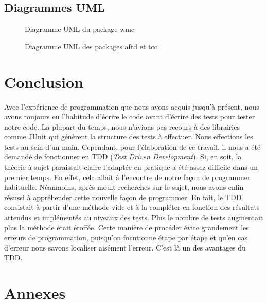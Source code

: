 \documentclass[11pt]{report}
\begin{document}
		
	\section{Diagrammes UML}\label{uml}
		
		\begin{figure}[h]
			\centering
			\caption{Diagramme UML du package wmc}
			\label{uml1}
		\end{figure}
		
		\begin{figure}[h]
			\centering
			\caption{Diagramme UML des packages aftd et tcc}
			\label{uml2}
		\end{figure}
		

\chapter{Conclusion}
	Avec l'expérience de programmation que nous avons acquis jusqu'à présent, nous avons toujours eu l'habitude d'écrire le code avant d'écrire des tests pour tester notre code. La plupart du temps, nous n'avions pas recours à des librairies comme JUnit qui génèrent la structure des tests à effectuer. Nous effections les tests au sein d'un main. Cependant, pour l'élaboration de ce travail, il nous a été demandé de fonctionner en TDD (\textit{Test Driven Development}). Si, en soit, la théorie à sujet paraissait claire l'adaptée en pratique a été assez difficile dans un premier temps. En effet, cela allait à l'encontre de notre façon de programmer habituelle. Néanmoins, après moult recherches sur le sujet, nous avons enfin résussi à appréhender cette nouvelle façon de programmer. En fait, le TDD consistait à partir d'une méthode vide et à la compléter en fonction des résultats attendus et implémentés au niveaux des tests. Plus le nombre de tests augmentait plus la méthode était étoffée. Cette manière de procéder évite grandement les erreurs de programmation, puisqu'on focntionne étape par étape et qu'en cas d'erreur nous savons localiser aisément l'erreur. C'est là un des avantages du TDD.     

\chapter{Annexes}
		
		
		
\end{document}
